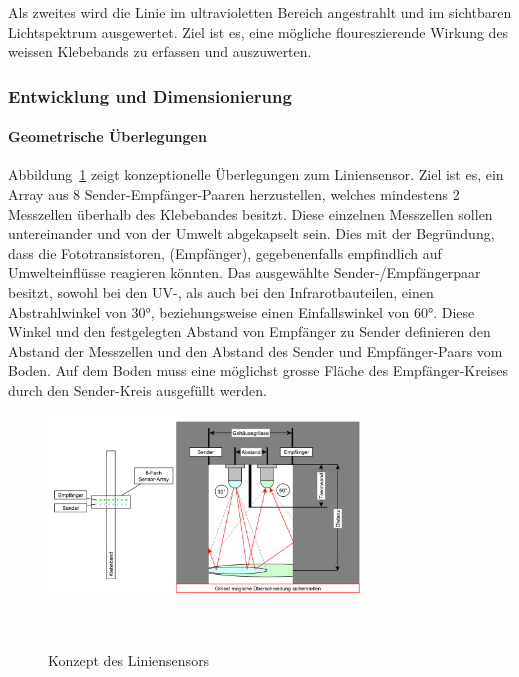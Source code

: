 \documentclass{article}
\begin{document}
Als zweites wird die Linie im ultravioletten Bereich angestrahlt und im
sichtbaren Lichtspektrum ausgewertet. Ziel ist es, eine mögliche floureszierende Wirkung
des weissen Klebebands zu erfassen und auszuwerten.

\subsubsection{Entwicklung und Dimensionierung}

\paragraph{Geometrische Überlegungen}
Abbildung~\ref{fig:Konzept_graphml} zeigt konzeptionelle Überlegungen zum
Liniensensor. Ziel ist es, ein Array aus 8 Sender-Empfänger-Paaren
herzustellen, welches mindestens 2 Messzellen überhalb des Klebebandes besitzt. Diese
einzelnen Messzellen sollen untereinander und von der Umwelt abgekapselt sein. Dies
mit der Begründung, dass die Fototransistoren, (Empfänger), gegebenenfalls empfindlich auf
Umwelteinflüsse reagieren könnten. Das ausgewählte Sender-/Empfängerpaar
besitzt, sowohl bei den UV-, als auch bei den Infrarotbauteilen, einen
Abstrahlwinkel von 30°, beziehungsweise einen Einfallswinkel von 60°. Diese
Winkel und den festgelegten Abstand von Empfänger zu Sender definieren den
Abstand der Messzellen und den Abstand des Sender
und Empfänger-Paars vom Boden. Auf dem Boden muss eine möglichst grosse Fläche des Empfänger-Kreises 
durch den Sender-Kreis ausgefüllt werden.

\begin{figure}[H]
    \centering
    \includegraphics[width=0.75\textwidth]{Konzept.pdf}
    \caption{Konzept des Liniensensors}~\label{fig:Konzept_graphml}
\end{figure}
\end{document}
